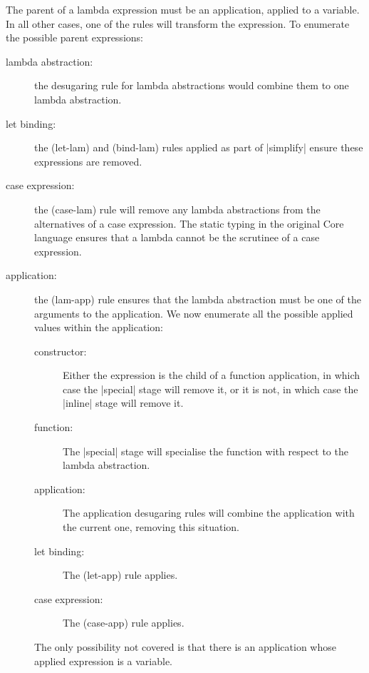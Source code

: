 \documentclass[preprint]{sigplanconf}
\begin{document}
\begin{lemma}{The parent of a lambda expression must be an application, applied to a variable.}
In all other cases, one of the rules will transform the expression. To enumerate the possible parent expressions:

\begin{description}
\item[lambda abstraction:] the desugaring rule for lambda abstractions would combine them to one lambda abstraction.
\item[let binding:] the (let-lam) and (bind-lam) rules applied as part of |simplify| ensure these expressions are removed.
\item[case expression:] the (case-lam) rule will remove any lambda abstractions from the alternatives of a case expression. The static typing in the original Core language ensures that a lambda cannot be the scrutinee of a case expression.
\item[application:] the (lam-app) rule ensures that the lambda abstraction must be one of the arguments to the application. We now enumerate all the possible applied values within the application:
    \begin{description}
    \item[constructor:] Either the expression is the child of a function application, in which case the |special| stage will remove it, or it is not, in which case the |inline| stage will remove it.
    \item[function:] The |special| stage will specialise the function with respect to the lambda abstraction.
    \item[application:] The application desugaring rules will combine the application with the current one, removing this situation.
    \item[let binding:] The (let-app) rule applies.
    \item[case expression:] The (case-app) rule applies.
    \end{description}

    The only possibility not covered is that there is an application whose applied expression is a variable.
\end{description}
\end{lemma}
\end{document}
